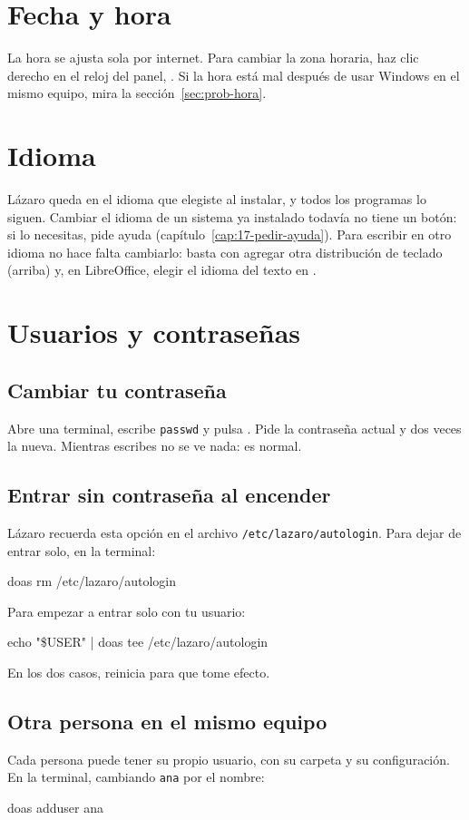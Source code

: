 \section{Fecha y hora}

La hora se ajusta sola por internet. Para cambiar la zona horaria, haz
clic derecho en el reloj del panel, . Si la hora está mal
después de usar Windows en el mismo equipo, mira la
sección~\ref{sec:prob-hora}.

\section{Idioma}

Lázaro queda en el idioma que elegiste al instalar, y todos los programas
lo siguen. Cambiar el idioma de un sistema ya instalado todavía no tiene un
botón: si lo necesitas, pide ayuda (capítulo~\ref{cap:17-pedir-ayuda}).
Para escribir en otro idioma no hace falta cambiarlo: basta con agregar
otra distribución de teclado (arriba) y, en LibreOffice, elegir el idioma
del texto en .

\section{Usuarios y contraseñas}

\subsection{Cambiar tu contraseña}
Abre una terminal, escribe \texttt{passwd} y pulsa . Pide la
contraseña actual y dos veces la nueva. Mientras escribes no se ve nada: es
normal.

\subsection{Entrar sin contraseña al encender}
Lázaro recuerda esta opción en el archivo \texttt{/etc/lazaro/autologin}.
Para dejar de entrar solo, en la terminal:
\begin{terminal}
doas rm /etc/lazaro/autologin
\end{terminal}
Para empezar a entrar solo con tu usuario:
\begin{terminal}
echo "\$USER" | doas tee /etc/lazaro/autologin
\end{terminal}
En los dos casos, reinicia para que tome efecto.

\subsection{Otra persona en el mismo equipo}
Cada persona puede tener su propio usuario, con su carpeta y su
configuración. En la terminal, cambiando \texttt{ana} por el nombre:
\begin{terminal}
doas adduser ana
\end{terminal}

